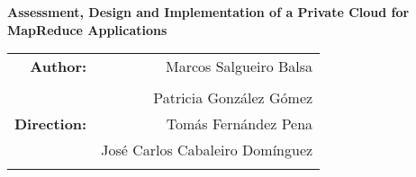 \begin{titlepage}
\begin{center}









{\huge \bf{Assessment, Design and Implementation of a Private Cloud for MapReduce Applications}}

\vspace{10.5cm}

\begin{flushright}
\begin{tabular}{r r@{}}
\textbf{Author:} & Marcos Salgueiro Balsa \\
& \\
& Patricia Gonz\'alez G\'omez \\
\textbf{Direction:} & Tom\'as Fern\'andez Pena \\
& Jos\'e Carlos Cabaleiro Dom\'inguez \\
& \\
\end{tabular}
\end{flushright}

\end{center}
\end{titlepage}
